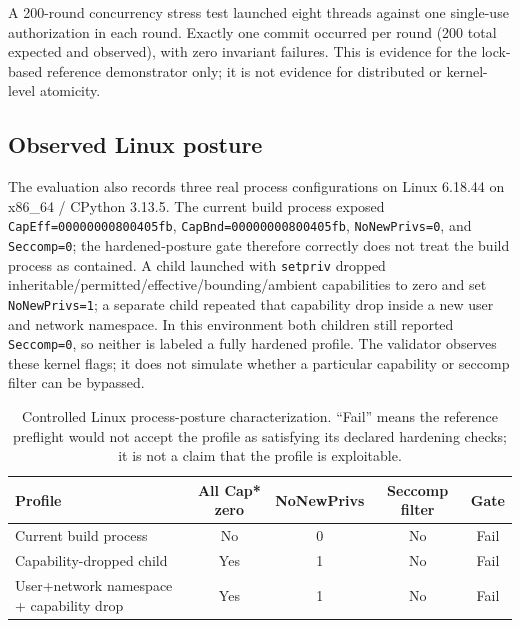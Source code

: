 \documentclass[11pt,letterpaper]{article}
\newcommand{\code}[1]{\texttt{#1}}
\begin{document}
A 200-round concurrency stress test launched eight threads against one single-use authorization in each round. Exactly one commit occurred per round (200 total expected and observed), with zero invariant failures. This is evidence for the lock-based reference demonstrator only; it is not evidence for distributed or kernel-level atomicity.

\subsection{Observed Linux posture}
The evaluation also records three real process configurations on Linux 6.18.44 on x86\_64 / CPython 3.13.5. The current build process exposed \code{CapEff=00000000800405fb}, \code{CapBnd=00000000800405fb}, \code{NoNewPrivs=0}, and \code{Seccomp=0}; the hardened-posture gate therefore correctly does not treat the build process as contained. A child launched with \code{setpriv} dropped inheritable/permitted/effective/bounding/ambient capabilities to zero and set \code{NoNewPrivs=1}; a separate child repeated that capability drop inside a new user and network namespace. In this environment both children still reported \code{Seccomp=0}, so neither is labeled a fully hardened profile. The validator observes these kernel flags; it does not simulate whether a particular capability or seccomp filter can be bypassed.

\begin{table}[htbp]
\centering
\caption{Controlled Linux process-posture characterization. ``Fail'' means the reference preflight would not accept the profile as satisfying its declared hardening checks; it is not a claim that the profile is exploitable.}
\small
\begin{tabularx}{\linewidth}{Y c c c c}
\toprule
\textbf{Profile} & \textbf{All Cap* zero} & \textbf{NoNewPrivs} & \textbf{Seccomp filter} & \textbf{Gate} \\
\midrule
Current build process & No & 0 & No & Fail \\
Capability-dropped child & Yes & 1 & No & Fail \\
User+network namespace + capability drop & Yes & 1 & No & Fail \\
\bottomrule
\end{tabularx}
\end{table}
\end{document}
